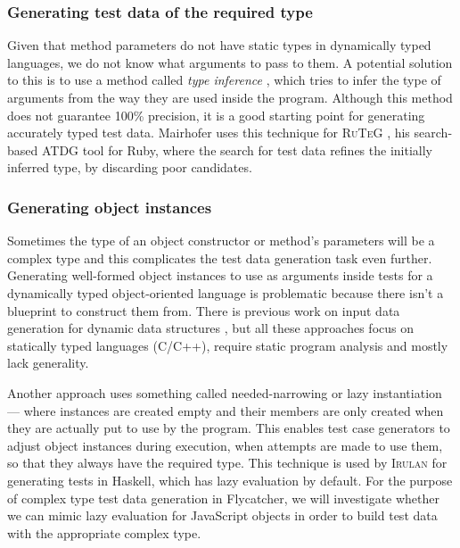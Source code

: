 \documentclass[a4paper,11pt,titlepage]{report}
\begin{document}
\subsubsection{Generating test data of the required type}
Given that method parameters do not have static types in dynamically typed languages, we do not know what arguments to pass to them. A potential solution to this is to use a method called \emph{type inference} \cite{pluquet2009fast}, which tries to infer the type of arguments from the way they are used inside the program. Although this method does not guarantee 100\% precision, it is a good starting point for generating accurately typed test data. Mairhofer uses this technique for \textsc{\small RuTeG} \cite{mairhofer2008search}, his search-based ATDG tool for Ruby, where the search for test data refines the initially inferred type, by discarding poor candidates.

\subsubsection{Generating object instances}
Sometimes the type of an object constructor or method's parameters will be a complex type and this complicates the test data generation task even further. Generating well-formed object instances to use as arguments inside tests for a dynamically typed object-oriented language is problematic because there isn't a blueprint to construct them from. There is previous work on input data generation for dynamic data structures \cite{korel1990automated, visvanathan2002generating, sai2005address, zhao2007automatic}, but all these approaches focus on statically typed languages (C/C++), require static program analysis and mostly lack generality.

Another approach uses something called needed-narrowing \cite{antoy1994needed} or lazy instantiation \cite{lindblad2007property} --- where instances are created empty and their members are only created when they are actually put to use by the program. This enables test case generators to adjust object instances during execution, when attempts are made to use them, so that they always have the required type. This technique is used by \textsc{Irulan} \cite{allwood2011high} for generating tests in Haskell, which has lazy evaluation by default. For the purpose of complex type test data generation in \textsf{Flycatcher}, we will investigate whether we can mimic lazy evaluation for JavaScript objects in order to build test data with the appropriate complex type.
\end{document}
